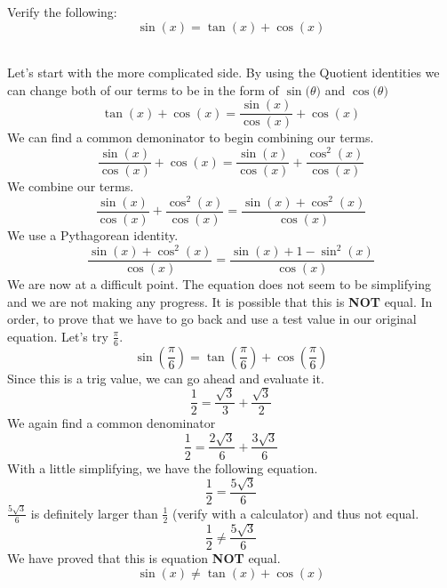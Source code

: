 \documentclass{ximera}
\begin{document}
\begin{example}
Verify the following:\\
\[
\sin{(x)}=\tan{(x)}+\cos{(x)}
\]
\\
\begin{explanation}
Let's start with the more complicated side.  By using the Quotient identities we can change both of our terms to be in the form of $\sin{(\theta})$ and  $\cos{(\theta})$ 
\[
\tan{(x)}+\cos{(x)}= \frac{\sin{(x)}}{\cos{(x)}}+\cos{(x)}
\]
We can find a common demoninator to begin combining our terms.
\[
\frac{\sin{(x)}}{\cos{(x)}}+\cos{(x)} = \frac{\sin{(x)}}{\cos{(x)}} + \frac{\cos^2{(x)}}{\cos{(x)}}
\]
We combine our terms.
\[
\frac{\sin{(x)}}{\cos{(x)}} + \frac{\cos^2{(x)}}{\cos{(x)}} =  \frac{\sin{(x)} + \cos^2{(x)}}{\cos{(x)}} 
\]
We use a Pythagorean identity.
\[
\frac{\sin{(x)} + \cos^2{(x)}}{\cos{(x)}} = \frac{\sin{(x)} + 1- \sin^2{(x)}}{\cos{(x)}}
\]
We are now at a difficult point. The equation does not seem to be simplifying and we are not making any progress. It is possible that this is \textbf{NOT} equal. In order, to prove that we have to go back and use a test value in our original equation. Let's try $\frac{\pi}{6}$.
\[
\sin{(\frac{\pi}{6})}=\tan{(\frac{\pi}{6})}+\cos{(\frac{\pi}{6})}
\]
Since this is a trig value, we can go ahead and evaluate it.
\[
\frac{1}{2}= \frac{\sqrt{3}}{3} + \frac{\sqrt{3}}{2}
\]
We again find a common denominator
\[
\frac{1}{2}= \frac{2\sqrt{3}}{6} + \frac{3\sqrt{3}}{6}
\]
With a little simplifying, we have the following equation.
\[
\frac{1}{2}= \frac{5\sqrt{3}}{6}
\]
$\frac{5\sqrt{3}}{6}$ is definitely larger than $\frac{1}{2}$ (verify with a calculator) and thus not equal.
\[
\frac{1}{2}\neq \frac{5\sqrt{3}}{6}
\]
We have proved that this is equation \textbf{NOT} equal. 
\[
\sin{(x)}\neq \tan{(x)}+\cos{(x)}
\]
\end{explanation}
\end{example}


\end{document}
